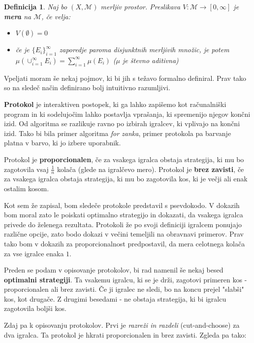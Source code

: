 \documentclass[a4paper, 12pt]{article}
\newtheorem{definicija}{Definicija}
\begin{document}
	\begin{definicija}
		Naj bo $(X, \mathcal{M})$ merljiv prostor. Preslikava $V : \mathcal{M} \to [0, \infty]$ je \textbf{mera} na $\mathcal{M}$, če velja:
		\begin{itemize}
			\item $V(\emptyset) = 0$
			\item če je $\{E_i\}_{i=1}^{\infty}$ zaporedje paroma disjunktnih merljivih množic, je potem $\mu(\cup_{i=1}^{\infty}E_i) = \sum_{i=1}^{\infty} \mu(E_i)$ ($\mu$ je števno aditivna)
		\end{itemize}		
	\end{definicija}

	Vpeljati moram še nekaj pojmov, ki bi jih s težavo formalno definiral. Prav tako so na sledeč način definirano bolj intuitivno razumljivi.
	
	\textbf{Protokol} je interaktiven postopek, ki ga lahko zapišemo kot računalniški program in ki sodelujočim lahko postavlja vprašanja, ki spremenijo njegov končni izid. Od algoritma se razlikuje ravno po izbirah igralcev, ki vplivajo na končni izid. Tako bi bila primer algoritma \textit{for zanka}, primer protokola pa barvanje platna v barvo, ki jo izbere uporabnik.
	
	Protokol je \textbf{proporcionalen}, če za vsakega igralca obstaja strategija, ki mu bo zagotovila vsaj $\frac{1}{n}$ kolača (glede na igralčevo mero). Protokol je \textbf{brez zavisti}, če za vsakega igralca obstaja strategija, ki mu bo zagotovila kos, ki je večji ali enak ostalim kosom. 
	
	Kot sem že zapisal, bom sledeče protokole predstavil s psevdokodo. V dokazih bom moral zato le poiskati optimalno strategijo in dokazati, da vsakega igralca privede do želenega rezultata. Protokoli že po svoji definiciji igralcem ponujajo različne opcije, zato bodo dokazi v večini temeljili na obravnavi primerov. Prav tako bom v dokazih za proporcionalnost predpostavil, da mera celotnega kolača za vse igralce enaka $1$. 
	
	Preden se podam v opisovanje protokolov, bi rad namenil še nekaj besed \textbf{optimalni strategiji}. Ta vsakemu igralcu, ki se je drži, zagotovi primeren kos - proporcionalen ali brez zavisti. Če ji igralec ne sledi, bo na koncu prejel "slabši" kos, kot drugače. Z drugimi besedami - ne obstaja strategija, ki bi igralcu zagotovila boljši kos. 
	
	Zdaj pa k opisovanju protokolov. Prvi je \textit{razreži in razdeli} (cut-and-choose) za dva igralca. Ta protokol je hkrati proporcionalen in brez zavisti. Zgleda pa tako:
	
\end{document}
